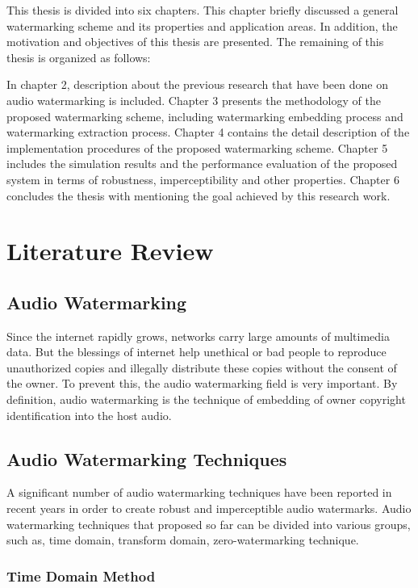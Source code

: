\documentclass[12pt,a4paper]{report}
\begin{document}
This thesis is divided into six chapters. This chapter briefly discussed a general watermarking scheme and its properties and application areas. In addition, the motivation and objectives of this thesis are presented. The remaining of this thesis is organized as follows:

\bigskip

In chapter 2, description about the previous research that have been done on audio watermarking is included. Chapter 3 presents the methodology of the proposed watermarking scheme, including watermarking embedding process and watermarking extraction process. Chapter 4 contains the detail description of the implementation procedures of the proposed watermarking scheme. Chapter 5 includes the simulation results and the performance  evaluation of the proposed system in terms of robustness, imperceptibility and other properties. Chapter 6 concludes the thesis with mentioning the goal achieved by this research work.


\chapter{Literature Review}

\section{Audio Watermarking}
Since the internet rapidly grows, networks carry
large amounts of multimedia data. But the blessings of internet help unethical or bad people to reproduce unauthorized copies and illegally distribute these copies without the consent of the owner. To prevent this, the audio watermarking field is very important. By definition, audio watermarking is the technique of embedding of owner copyright identification into the host audio.

\section{Audio Watermarking Techniques}

A significant number of audio watermarking techniques have been reported in recent years in order to create robust and imperceptible audio watermarks. Audio watermarking techniques that proposed so far can be divided into various groups, such as, time domain, transform domain, zero-watermarking technique.

\subsection{Time Domain Method}
\end{document}

